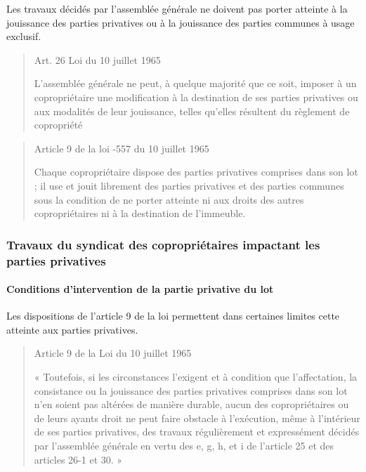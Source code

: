 			Les travaux décidés par l’assemblée générale ne doivent pas porter atteinte à la jouissance des parties privatives ou à la jouissance des parties communes à usage exclusif.
			
			\begin{quote}
				Art. 26 Loi du 10 juillet 1965
				
				L'assemblée générale ne peut, à quelque majorité que ce soit, imposer à un copropriétaire une modification à la destination de ses parties privatives ou aux modalités de leur jouissance, telles qu'elles résultent du règlement de copropriété
			\end{quote}
			
			\begin{quote}
				Article 9 de la loi -557 du 10 juillet 1965
				
				Chaque copropriétaire dispose des parties privatives comprises dans son lot ; il use et jouit librement des parties privatives et des parties communes sous la condition de ne porter atteinte ni aux droits des autres copropriétaires ni à la destination de l'immeuble.
			\end{quote}
		
		\subsubsection{Travaux du syndicat des copropriétaires impactant les parties privatives}
		
			\paragraph{Conditions d’intervention de la partie privative du lot}
			
				Les dispositions de l’article 9 de la loi permettent dans certaines limites cette atteinte aux parties privatives.
				
				\begin{quote}
					Article 9 de la Loi du 10 juillet 1965
				
					« Toutefois, si les circonstances l'exigent et à condition que l'affectation, la consistance ou la jouissance des parties privatives comprises dans son lot n'en soient pas altérées de manière durable, aucun des copropriétaires ou de leurs ayants droit ne peut faire obstacle à l'exécution, même à l'intérieur de ses parties privatives, des travaux régulièrement et expressément décidés par l'assemblée générale en vertu des e, g, h, et i de l'article 25 et des articles 26-1 et 30. »
				\end{quote}
				
